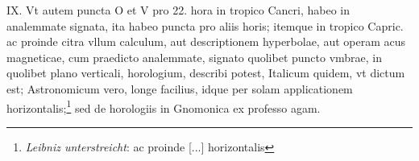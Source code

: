 \pend \pstart [p.~167] IX. Vt autem puncta O et V pro 22. hora in tropico\protect{} Cancri\protect{}, habeo in analemmate signata, ita habeo puncta  pro aliis horis; itemque in tropico\protect{} Capric.\protect{} ac proinde citra  vllum calculum, aut descriptionem hyperbolae, aut  operam acus magneticae\protect{}, cum praedicto analemmate,  signato quolibet puncto vmbrae, in quolibet plano verticali, horologium\protect{}, describi potest, Italicum quidem,  vt dictum est; Astronomicum vero, longe facilius, idque per solam applicationem horizontalis;\footnote{\textit{Leibniz unterstreicht}: ac proinde [...] horizontalis} sed de horologiis\protect{} in Gnomonica ex professo agam.
